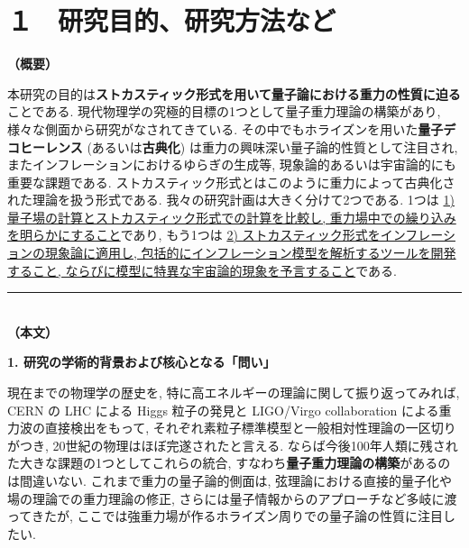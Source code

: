 \documentclass[11pt,a4j,dvipdfmx]{jarticle} 					%
\newcommand{\研究課題名}{\mgfamily\sffamily ストカスティック形式で迫る重力と量子論}
\newcommand{\研究機関名}{\mgfamily\sffamily 名古屋大学}
\newcommand{\研究代表者氏名}{\mgfamily\sffamily 多田祐一郎}
\newcommand{\研究期間の最終元号年度}{34}  %
\renewcommand{\emph}[1]{{\sffamily\gtfamily\bfseries #1}}
\begin{document}

\section{１　研究目的、研究方法など}

\noindent
\textbf{\mgfamily\sffamily（概要）}\\
	\mgfamily\sffamily
	
	本研究の目的は\emph{ストカスティック形式を用いて量子論における重力の性質に迫る}ことである. 
	現代物理学の究極的目標の1つとして量子重力理論の構築があり, 様々な側面から研究がなされてきている.
	その中でもホライズンを用いた\emph{量子デコヒーレンス} (あるいは\emph{古典化}) は重力の興味深い量子論的性質として注目され,
	またインフレーションにおけるゆらぎの生成等, 現象論的あるいは宇宙論的にも重要な課題である.
	ストカスティック形式とはこのように重力によって古典化された理論を扱う形式である.
	我々の研究計画は大きく分けて2つである. 1つは \ul{1) 量子場の計算とストカスティック形式での計算を比較し,
	重力場中での繰り込みを明らかにすること}であり, もう1つは \ul{2) ストカスティック形式をインフレーションの現象論に適用し,
	包括的にインフレーション模型を解析するツールを開発すること, ならびに模型に特異な宇宙論的現象を予言すること}である.
	
	\vspace*{13zw}	%

\noindent
\rule{\linewidth}{1pt}\\
\noindent
\textbf{（本文）}

\begin{mdframed}[roundcorner=0.5zw,
	innertopmargin=0.8zw,innerbottommargin=0.8zw,
	linecolor=black!50,linewidth=0.2zw,
	backgroundcolor=black!10]
	{\bfseries\gtfamily\sffamily\large 1. 研究の学術的背景および核心となる「問い」}
\end{mdframed}

現在までの物理学の歴史を, 特に高エネルギーの理論に関して振り返ってみれば, CERN の LHC による Higgs 粒子の発見と LIGO/Virgo collaboration による重力波の直接検出をもって,
それぞれ素粒子標準模型と一般相対性理論の一区切りがつき, 20世紀の物理はほぼ完遂されたと言える. 
ならば今後100年人類に残された大きな課題の1つとしてこれらの統合, すなわち\emph{量子重力理論の構築}があるのは間違いない.
これまで重力の量子論的側面は, 弦理論における直接的量子化や場の理論での重力理論の修正, さらには量子情報からのアプローチなど多岐に渡ってきたが,
ここでは強重力場が作るホライズン周りでの量子論の性質に注目したい.
\end{document}
